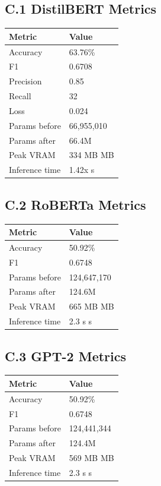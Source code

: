\subsection{C.1 DistilBERT Metrics}

\begin{table}[H]
\centering
\small
\begin{tabular}{ll}
\toprule
\textbf{Metric} & \textbf{Value} \\
\midrule
Accuracy & 63.76\% \\
F1 & 0.6708 \\
Precision & 0.85 \\
Recall & 32 \\
Loss & 0.024 \\
Params before & 66,955,010 \\
Params after & 66.4M \\
Peak VRAM & 334 MB MB \\
Inference time & 1.42x s \\
\bottomrule
\end{tabular}
\end{table}

\subsection{C.2 RoBERTa Metrics}

\begin{table}[H]
\centering
\small
\begin{tabular}{ll}
\toprule
\textbf{Metric} & \textbf{Value} \\
\midrule
Accuracy & 50.92\% \\
F1 & 0.6748 \\
Params before & 124,647,170 \\
Params after & 124.6M \\
Peak VRAM & 665 MB MB \\
Inference time & 2.3 s s \\
\bottomrule
\end{tabular}
\end{table}

\subsection{C.3 GPT-2 Metrics}

\begin{table}[H]
\centering
\small
\begin{tabular}{ll}
\toprule
\textbf{Metric} & \textbf{Value} \\
\midrule
Accuracy & 50.92\% \\
F1 & 0.6748 \\
Params before & 124,441,344 \\
Params after & 124.4M \\
Peak VRAM & 569 MB MB \\
Inference time & 2.3 s s \\
\bottomrule
\end{tabular}
\end{table}

